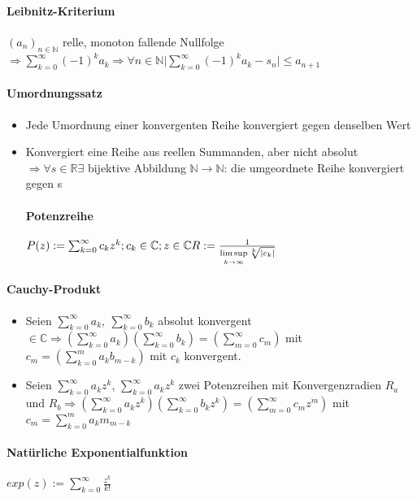 \documentclass[paper=a3,paper=landscape, fontsize=9pt,DIV=25]{scrartcl}
\newcommand{\real}{{\mathbb{R}}}
\newcommand{\compl}{\mathbb{C}}
\newcommand{\nat}{\mathbb{N}}
\newcommand{\aseq}{(a_n)_{n \in \nat}}
\begin{document}
\begin{multicols*}{4}
  \paragraph{Leibnitz-Kriterium}
  $\aseq$ relle, monoton fallende Nullfolge $ \Rightarrow \sum_{k=0}^{\infty} (-1)^ka_k \Rightarrow \forall n \in \nat \lvert \sum_{k=0}^{\infty}(-1)^ka_k-s_n \rvert \leq  a_{n+1}$


  \paragraph{Umordnungssatz}\begin{itemize}
  \item Jede Umordnung einer konvergenten Reihe konvergiert gegen denselben Wert
  \item Konvergiert eine Reihe aus reellen Summanden, aber nicht absolut $\Rightarrow \forall s \in \real \exists$ bijektive Abbildung $\nat \rightarrow \nat$: die umgeordnete Reihe konvergiert gegen s
    \paragraph{Potenzreihe}
    $ P(z) := \sum_{k=0}^{\infty} c_kz^k; c_k \in \compl; z \in \compl\\R := \frac{1}{\limsup\limits_{k \rightarrow \infty} \sqrt[k]{|c_k|}}$
  \end{itemize}


  \paragraph{Cauchy-Produkt}
  \begin{itemize}
  \item Seien $ \sum_{k=0}^{\infty} a_k,\:\sum_{k=0}^{\infty} b_k$ absolut konvergent $ \in \compl \Rightarrow (\sum_{k=0}^{\infty} a_k) (\sum_{k=0}^{\infty} b_k) = (\sum_{m=0}^{\infty} c_m)$ mit $ c_m=(\sum_{k=0}^{m} a_kb_{m-k})$ mit $c_k$ konvergent.
  \item Seien $ \sum_{k=0}^{\infty} a_kz^k$, $\sum_{k=0}^{\infty} a_kz^k$ zwei Potenzreihen mit Konvergenzradien $R_a$ und $ R_b \Rightarrow (\sum_{k=0}^{\infty} a_kz^k)(\sum_{k=0}^{\infty} b_kz^k)=(\sum_{m=0}^{\infty} c_mz^m)$ mit $ c_m = \sum_{k=0}^{m} a_km_{m-k}$
  \end{itemize}


  \paragraph{Natürliche Exponentialfunktion}
  $ exp(z) := \sum_{k=0}^{\infty} \frac{z^k}{k!}$



\end{multicols*}
\end{document}
